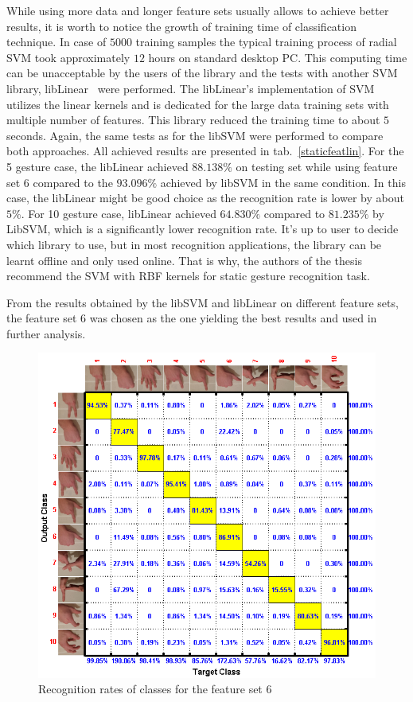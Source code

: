 While using more data and longer feature sets usually allows to achieve better results, it is worth to notice the growth of training time of classification technique. 
In case of $5000$ training samples the typical training process of radial SVM took approximately $12$ hours on standard desktop PC. 
This computing time can be unacceptable by the users of the library and the tests with another SVM library, libLinear~\cite{libLinear} were performed. 
The libLinear's implementation of SVM utilizes the linear kernels and is dedicated for the large data training sets with multiple number of features. 
This library reduced the training time to about $5$ seconds.
Again, the same tests as for the libSVM were performed to compare both approaches.
All achieved results are presented in tab.~\ref{staticfeatlin}.
For the 5 gesture case, the libLinear achieved $88.138\%$ on testing set while using feature set 6 compared to the $93.096\%$ achieved by libSVM in the same condition.
In this case, the libLinear might be good choice as the recognition rate is lower by about $5\%$.
For 10 gesture case, libLinear achieved $64.830\%$ compared to $81.235\%$ by LibSVM, which is a significantly lower recognition rate.
It's up to user to decide which library to use, but in most recognition applications, the library can be learnt offline and only used online.
That is why, the authors of the thesis recommend the SVM with RBF kernels for static gesture recognition task.

From the results obtained by the libSVM and libLinear on different feature sets, the feature set $6$ was chosen as the one yielding the best results and used in further analysis.

\begin{figure}[htb]
\centering
 \includegraphics[width=0.8\columnwidth]{figures/staticClassesRecognitionRates.png}
 \caption{Recognition rates of classes for the feature set $6$}
 \label{staticClassesRecognitionRates}
\end{figure}

